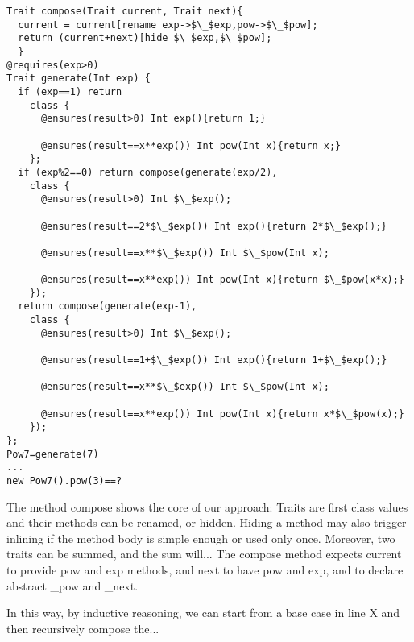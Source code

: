 \begin{lstlisting}
Trait compose(Trait current, Trait next){
  current = current[rename exp->$\_$exp,pow->$\_$pow];
  return (current+next)[hide $\_$exp,$\_$pow];
  }
@requires(exp>0)
Trait generate(Int exp) {
  if (exp==1) return 
    class {
      @ensures(result>0) Int exp(){return 1;}

      @ensures(result==x**exp()) Int pow(Int x){return x;}
    };
  if (exp%2==0) return compose(generate(exp/2),
    class {
      @ensures(result>0) Int $\_$exp();

      @ensures(result==2*$\_$exp()) Int exp(){return 2*$\_$exp();}

      @ensures(result==x**$\_$exp()) Int $\_$pow(Int x);

      @ensures(result==x**exp()) Int pow(Int x){return $\_$pow(x*x);}
    });
  return compose(generate(exp-1),
    class {
      @ensures(result>0) Int $\_$exp();

      @ensures(result==1+$\_$exp()) Int exp(){return 1+$\_$exp();}

      @ensures(result==x**$\_$exp()) Int $\_$pow(Int x);

      @ensures(result==x**exp()) Int pow(Int x){return x*$\_$pow(x);}
    });
};
Pow7=generate(7)
...
new Pow7().pow(3)==?
\end{lstlisting}
The method compose shows the core of our approach:
Traits are first class values and their methods
can be renamed, or hidden. Hiding a method may also trigger inlining if the method body is simple enough or used only once.
Moreover, two traits can be summed, and the sum will...
The compose method expects current to provide pow and exp methods, and next to have pow and exp, and to declare abstract _pow and _next.

In this way, by inductive reasoning, we can start from a base case in line X and then recursively compose the...
%
